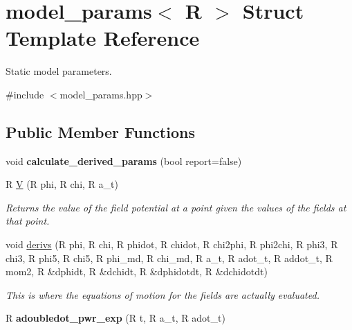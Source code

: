\hypertarget{structmodel__params}{
\section{model\_\-params$<$ R $>$ Struct Template Reference}
\label{structmodel__params}
}


Static model parameters.  




{\ttfamily \#include $<$model\_\-params.hpp$>$}

\subsection*{Public Member Functions}
\begin{DoxyCompactItemize}
\item 
\hypertarget{structmodel__params_a9bcd0871ce87aa307d0df35b7e073d72}{
void {\bfseries calculate\_\-derived\_\-params} (bool report=false)}
\label{structmodel__params_a9bcd0871ce87aa307d0df35b7e073d72}

\item 
R \hyperlink{structmodel__params_a2ca88aaf39658ce4bbe31cf92654040b}{V} (R phi, R chi, R a\_\-t)
\begin{DoxyCompactList}\small\item\em Returns the value of the field potential at a point given the values of the fields at that point. \item\end{DoxyCompactList}\item 
void \hyperlink{structmodel__params_af08a5674a6b3cb272181d29483e763d9}{derivs} (R phi, R chi, R phidot, R chidot, R chi2phi, R phi2chi, R phi3, R chi3, R phi5, R chi5, R phi\_\-md, R chi\_\-md, R a\_\-t, R adot\_\-t, R addot\_\-t, R mom2, R \&dphidt, R \&dchidt, R \&dphidotdt, R \&dchidotdt)
\begin{DoxyCompactList}\small\item\em This is where the equations of motion for the fields are actually evaluated. \item\end{DoxyCompactList}\item 
\hypertarget{structmodel__params_ac1a992d6e20b7e30b1d6e2d29bbca9d5}{
R {\bfseries adoubledot\_\-pwr\_\-exp} (R t, R a\_\-t, R adot\_\-t)}
\label{structmodel__params_ac1a992d6e20b7e30b1d6e2d29bbca9d5}


\end{DoxyCompactItemize}
